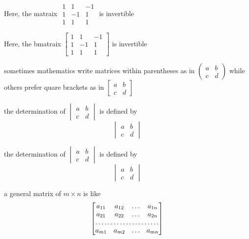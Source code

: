 \documentclass[a4paper, UTF8]{article}
\begin{document}
Here, the matraix
$\begin{matrix}
1 & 1 & -1\\
1 & -1 & 1\\
1 & 1 & 1
\end{matrix}$
is invertible

Here, the bmatraix
$\begin{bmatrix}
1 & 1 & -1\\
1 & -1 & 1\\
1 & 1 & 1
\end{bmatrix}$
is invertible

sometimes mathematics write matrices within parentheses as in 
$
\begin{pmatrix}
    a & b\\
    c & d
\end{pmatrix}
$
while others prefer quare brackets as in 
$
\begin{bmatrix}
    a & b\\
    c & d
\end{bmatrix}
$

the determination of 
$
\begin{vmatrix}
    a & b\\
    c & d
\end{vmatrix}
$
is defined by 
\begin{equation*}
    \begin{vmatrix}
        a & b\\
        c & d
    \end{vmatrix}
\end{equation*}

the determination of 
$
\begin{vmatrix}
    a & b\\
    c & d
\end{vmatrix}
$
is defined by 
$$
\begin{vmatrix}
    a & b\\
    c & d
\end{vmatrix}
$$

a general matrix of $m\times n$ is like
\begin{equation*}
    \begin{bmatrix}
        a_{11} & a_{12} & \dots & a_{1n}\\
        a_{21} & a_{22} & \dots & a_{2n}\\
        \hdotsfor{4}\\
        a_{m1} & a_{m2} & \dots & a_{mn}
    \end{bmatrix}
\end{equation*}
\end{document}

